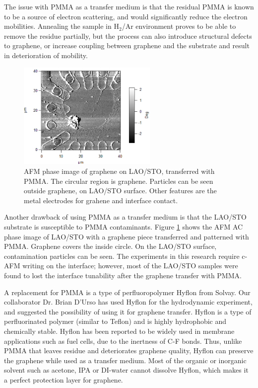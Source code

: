 \documentclass[pdflatex, sectionletters, 12pt]{pittetd}    %
\begin{document}
The issue with PMMA as a transfer medium is that the residual PMMA is known to be a source of electron scattering, and would significantly reduce the electron mobilities\cite{pirkle2011effect, lin2011graphene, cheng2011toward}. Annealing the sample in H$_2$/Ar environment proves to be able to remove the residue partially, but the process can also introduce structural defects to graphene\cite{lin2011graphene}, or increase coupling between graphene and the substrate and result in deterioration of mobility\cite{cheng2011toward}. 
\\

\begin{figure}[h!]
	\centering
	\includegraphics[width=0.60\textwidth]{Drawing/PMMAResidue.png}
	\caption{AFM phase image of graphene on LAO/STO, transferred with PMMA. The circular region is graphene. Particles can be seen outside graphene, on LAO/STO surface. Other features are the metal electrodes for grahene and interface contact.}
	\label{FIG:PMMAResidue}
\end{figure}

Another drawback of using PMMA as a transfer medium is that the LAO/STO substrate is susceptible to PMMA contaminants. Figure \ref{FIG:PMMAResidue} shows the AFM AC phase image of  LAO/STO with a graphene piece transferred and patterned with PMMA. Graphene covers the inside circle. On the LAO/STO surface, contamination particles can be seen. The experiments in this research require c-AFM writing on the interface; however, most of the LAO/STO samples were found to lost the interface tunability after the graphene transfer with PMMA\cite{li2016method}. 

A replacement for PMMA is a type of perfluoropolymer Hyflon from Solvay. Our collaborator Dr. Brian D'Urso has used Hyflon for the hydrodynamic experiment, and suggested the possibility of using it for graphene transfer. Hyflon is a type of perfluorinated polymer (similar to Teflon) and is highly hydrophobic and chemically stable. Hyflon has been reported to be widely used in membrane applications such as fuel cells, due to the inertness of C-F bonds\cite{arcella2005hyflon, merlo2007membrane, zhang2012recent}. Thus, unlike PMMA that leaves residue and deteriorates graphene quality, Hyflon can preserve the graphene while used as a transfer medium. Most of the organic or inorganic solvent such as acetone, IPA or DI-water cannot dissolve Hyflon, which makes it a perfect protection layer for graphene. 
\end{document}
